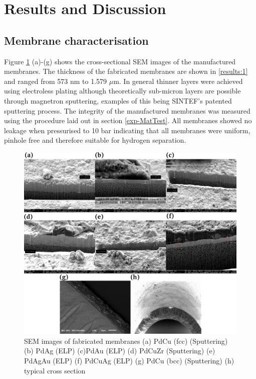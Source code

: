 \section{Results and Discussion}
\subsection{Membrane characterisation}

Figure \ref{fig:1} (a)-(g) shows the cross-sectional SEM images of the manufactured membranes.  The thickness of the fabricated membranes are shown in \ref{results:1} and ranged from 573 nm to 1.579 $\mu$m. In general thinner layers were achieved using electroless plating although theoretically sub-micron layers are possible through magnetron sputtering, examples of this being SINTEF’s patented sputtering process.\cite{Peters2011} The integrity of the manufactured membranes was measured using the procedure laid out in section \ref{exp-MatTest}. All membranes showed no leakage when pressurised to 10 bar indicating that all membranes were uniform, pinhole free and therefore suitable for hydrogen separation. \cite{GouveiaGil2015}

\begin{figure}
    \centering
    \includegraphics[width=\linewidth, height=0.9\textheight,keepaspectratio]{figures/Semxsect.png}
    \caption{SEM images of fabricated membranes (a) PdCu (fcc) (Sputtering) (b) PdAg (ELP) (c)PdAu (ELP) (d) PdCuZr (Sputtering) (e) PdAgAu (ELP) (f) PdCuAg (ELP) (g) PdCu (bcc) (Sputtering) (h) typical cross section}
    \label{fig:1}
\end{figure}

